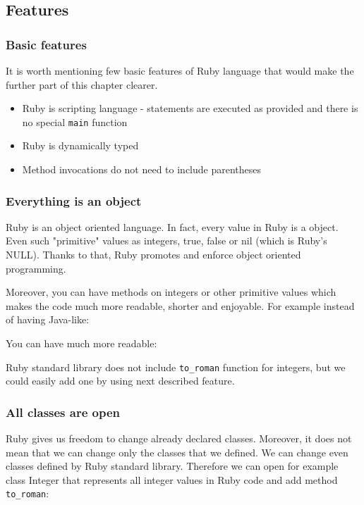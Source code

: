     \subsection{Features}
      \subsubsection{Basic features}
      It is worth mentioning few basic features of Ruby language that would make the further part of this chapter clearer.
      \begin{itemize}
        \item Ruby is scripting language - statements are executed as provided and there is no special \texttt{main} function
    	  \item Ruby is dynamically typed
    	  \item Method invocations do not need to include parentheses
    	\end{itemize}
    	
      \subsubsection{Everything is an object}
      Ruby is an object oriented language. In fact, every value in Ruby is a object. Even such "primitive" values as integers, true, false or nil (which is Ruby's NULL). Thanks to that, Ruby promotes and enforce object oriented programming. 
      
      Moreover, you can have methods on integers or other primitive values which makes the code much more readable, shorter and enjoyable. For example instead of having Java-like:
      
      
      
      You can have much more readable:
      
      
      
      Ruby standard library does not include \texttt{to\_roman} function for integers, but we could easily add one by using next described feature.
      
      \subsubsection{All classes are open}
      Ruby gives us freedom to change already declared classes. Moreover, it does not mean that we can change only the classes that we defined. We can change even classes defined by Ruby standard library. Therefore we can open for example class Integer that represents all integer values in Ruby code and add method \texttt{to\_roman}:
      
